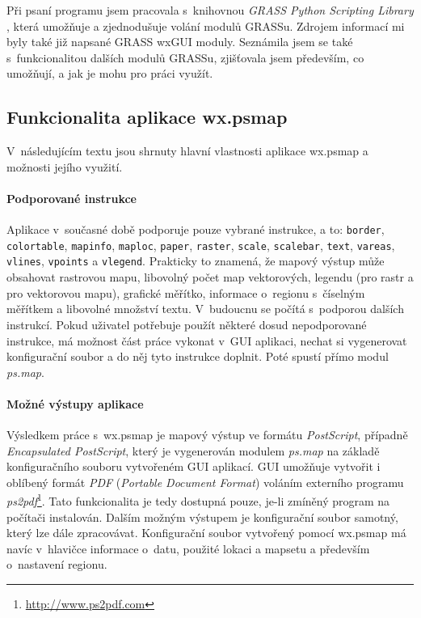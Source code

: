 \documentclass[a4paper,12pt,draft]{article}
\newcommand{\modul}[1]{\emph{#1}}
\newcommand{\instr}[1]{\lstinline[style=psmapInline]|#1|}
\begin{document}
Při psaní programu jsem pracovala s~knihovnou \emph{GRASS Python
Scripting Library} \cite{script}, která umožňuje a zjednodušuje
volání modulů GRASSu. Zdrojem informací mi byly také
již napsané GRASS wxGUI moduly. Seznámila jsem se také s~funkcionalitou
dalších  modulů GRASSu, zjišťovala
jsem především, co umožňují, a jak je mohu pro práci využít.

\subsection{Funkcionalita aplikace wx.psmap}
V~následujícím textu jsou shrnuty hlavní vlastnosti aplikace wx.psmap a
možnosti jejího využití.


\paragraph*{Podporované instrukce}
Aplikace v~současné době podporuje pouze vybrané instrukce, a to:
\instr{border}, \instr{colortable}, \instr{mapinfo}, \instr{maploc},
\instr{paper}, \instr{raster}, \instr{scale}, \instr{scalebar},
\instr{text}, \instr{vareas}, \instr{vlines}, \instr{vpoints} a
\instr{vlegend}. Prakticky to znamená, že mapový výstup může
obsahovat rastrovou mapu, libovolný počet map vektorových, legendu (pro
rastr a pro vektorovou mapu), grafické měřítko, informace o~regionu
s~číselným měřítkem a libovolné množství textu. V~budoucnu se
počítá s~podporou dalších instrukcí. Pokud uživatel potřebuje
použít některé dosud nepodporované instrukce, má možnost část
práce vykonat v~GUI aplikaci, nechat si vygenerovat konfigurační
soubor a do něj tyto instrukce doplnit. Poté spustí přímo modul
\modul{ps.map}.

\paragraph*{Možné výstupy aplikace}
Výsledkem práce s~wx.psmap je mapový výstup ve formátu \emph{PostScript},
případně \emph{Encapsulated PostScript}, který je vygenerován modulem
\modul{ps.map} na základě konfiguračního souboru vytvořeném GUI
aplikací. GUI umožňuje vytvořit i oblíbený formát \emph{PDF} (\emph{Portable
Document Format}) voláním externího programu
\emph{ps2pdf}\footnote{\url{http://www.ps2pdf.com}}. Tato funkcionalita je tedy
dostupná pouze, je-li zmíněný program na počítači instalován. Dalším možným
výstupem je konfigurační soubor samotný,
který lze dále zpracovávat. Konfigurační soubor vytvořený pomocí
wx.psmap má navíc v~hlavičce informace o~datu, použité lokaci a
mapsetu a především o~nastavení regionu.
\end{document}
